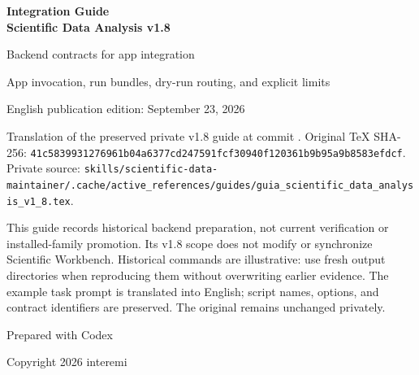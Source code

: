 \documentclass[11pt,a4paper]{article}
\newcommand{\code}[1]{\texttt{\detokenize{#1}}}
\begin{document}
\begin{titlepage}
\centering
\vspace*{1.0cm}
{\Huge\bfseries\color{titleblue} Integration Guide\\[0.15cm]
Scientific Data Analysis v1.8\par}
\vspace{0.65cm}
{\Large Backend contracts for app integration\par}
\vspace{0.8cm}
{\large App invocation, run bundles, dry-run routing, and explicit limits\par}
\vspace{0.8cm}
{\large English publication edition: September 23, 2026\par}
\vspace{0.5cm}
\begin{minipage}{0.93\textwidth}
\small\raggedright
Translation of the preserved private v1.8 guide at commit \code{994eaea}.
Original TeX SHA-256:
\nolinkurl{41c5839931276961b04a6377cd247591fcf30940f120361b9b95a9b8583efdcf}.
Private source:
\nolinkurl{skills/scientific-data-maintainer/.cache/active_references/guides/guia_scientific_data_analysis_v1_8.tex}.

This guide records historical backend preparation, not current verification
or installed-family promotion. Its v1.8 scope does not modify or synchronize
Scientific Workbench. Historical commands are illustrative: use fresh output
directories when reproducing them without overwriting earlier evidence.
The example task prompt is translated into English; script names, options,
and contract identifiers are preserved. The original remains unchanged privately.
\end{minipage}
\vfill
{\large Prepared with Codex\par}
{\large Copyright 2026 interemi\par}
\end{titlepage}

\clearpage
{}
\begin{abstract}
\code{scientific-data-analysis} v1.8 is a contract release. It prepares the
editable skill as a more predictable backend for Scientific Workbench,
without claiming that the app is already synchronized to v2.0. The backend
comes first: parseable JSON, artifact types, run bundles, dry-run routing,
an app-readiness matrix, app-like regressions, and explicit separation of
normal, expert, optional, legacy, maintainer, and unexposed modes.

v1.7 asked whether the skill was useful in real settings. v1.8 asks whether
an app can invoke it predictably, read the result, present artifacts, and
explain the next step while preserving original inputs.
\end{abstract}
\tableofcontents
\newpage
{}
\end{document}
